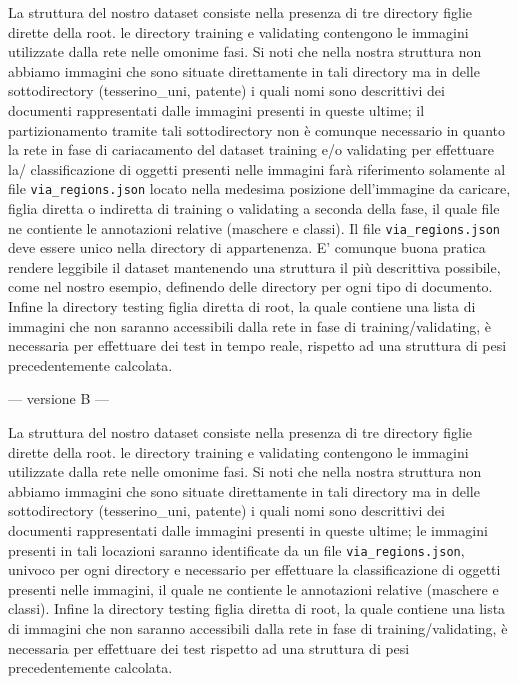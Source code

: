 \documentclass[12pt,a4paper]{article}
\begin{document}
La struttura del nostro dataset consiste nella presenza di tre directory figlie dirette della root.
le directory training e validating contengono le immagini utilizzate dalla rete nelle omonime fasi.
Si noti che nella nostra struttura non abbiamo immagini che sono situate direttamente in tali directory
ma in delle sottodirectory (tesserino\_uni, patente) i quali nomi sono descrittivi dei documenti
rappresentati dalle immagini presenti in queste ultime; il partizionamento tramite tali sottodirectory non è comunque
necessario in quanto la rete in fase di cariacamento del dataset training e/o validating per effettuare la/
classificazione di oggetti presenti nelle immagini farà riferimento solamente al file \texttt{via\_regions.json}
locato nella medesima posizione dell'immagine da caricare, figlia diretta o indiretta di training o validating a
seconda della fase, il quale file ne contiente le annotazioni relative (maschere e classi).
Il file \texttt{via\_regions.json} deve essere unico nella directory di appartenenza.
E' comunque buona pratica rendere leggibile il dataset mantenendo una struttura il più
descrittiva possibile, come nel nostro esempio, definendo delle directory per ogni tipo di documento.
Infine la directory testing figlia diretta di root, la quale contiene una lista di immagini che non saranno accessibili dalla
rete in fase di training/validating, è necessaria per effettuare dei test in tempo reale,
rispetto ad una struttura di pesi precedentemente calcolata.

--- versione B ---

La struttura del nostro dataset consiste nella presenza di tre directory figlie dirette della root.
le directory training e validating contengono le immagini utilizzate dalla rete nelle omonime fasi.
Si noti che nella nostra struttura non abbiamo immagini che sono situate direttamente in tali directory
ma in delle sottodirectory (tesserino\_uni, patente) i quali nomi sono descrittivi dei documenti
rappresentati dalle immagini presenti in queste ultime; le immagini presenti in tali locazioni saranno identificate da un
file \texttt{via\_regions.json}, univoco per ogni directory e necessario per effettuare la
classificazione di oggetti presenti nelle immagini, il quale ne contiente le annotazioni relative (maschere e classi).
Infine la directory testing figlia diretta di root, la quale contiene una lista di immagini che non saranno accessibili dalla
rete in fase di training/validating, è necessaria per effettuare dei test rispetto ad una struttura di pesi precedentemente calcolata.
\end{document}

